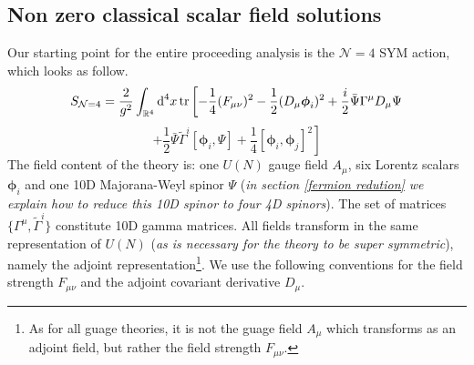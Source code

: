\subsection{Non zero classical scalar field solutions}\label{cl scalar solutions}
Our starting point for the entire proceeding analysis is the $\mathcal{N}=4$ SYM action, which looks as follow.
%
%
\begin{equation*}
S_{\mathcal{N}=4} = \frac{2}{g^2} \int_{\mathbb{R}^4} \text{d}^4 x
\tr \left[
-\frac{1}{4} (F_{\mu \nu})^2
-\frac{1}{2} (D_\mu \boldsymbol{\phi}_i)^2
+ \frac{i}{2} \bar{\Psi} \Gamma^\mu D_{\mu} \Psi
\right.
\end{equation*}
%
%
\begin{equation}\label{SYM action}
\left.
+ \frac{1}{2} \bar{\Psi} \tilde{\Gamma}^i [\boldsymbol{\phi}_i, \Psi]
+ \frac{1}{4} [\boldsymbol{\phi}_i, \boldsymbol{\phi}_j]^2
\right]
\end{equation}
%
%
The field content of the theory is: one $U(N)$ gauge field $A_\mu$, six Lorentz scalars $\boldsymbol{\phi}_i$ and one 10D Majorana-Weyl spinor $\Psi$ (\textit{in section \ref{fermion redution} we explain how to reduce this 10D spinor to four 4D spinors}). The set of matrices $\{\Gamma^\mu , \tilde{\Gamma}^i \}$ constitute 10D gamma matrices. All fields transform in the same representation of $U(N)$ (\textit{as is necessary for the theory to be super symmetric}), namely the adjoint representation\footnote{As for all guage theories, it is not the guage field $A_\mu$ which transforms as an adjoint field, but rather the field strength $F_{\mu\nu}$.}. We use the following conventions for the field strength $F_{\mu\nu}$ and the adjoint covariant derivative $D_\mu$.

